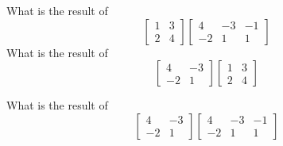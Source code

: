 \bexo
What is the result of 
\begin{equation*}
\left[
\begin{array}{cc}
1 & 3\\
2 & 4
\end{array}
\right]
\left[
\begin{array}{ccc}
4 & -3 & -1\\
-2 & 1 & 1
\end{array}
\right]
\end{equation*}
\eexo
{}
\bexo
What is the result of 
\begin{equation*}
\left[
\begin{array}{cc}
4 & -3\\
-2 & 1
\end{array}
\right]
\left[
\begin{array}{cc}
1 & 3\\
2 & 4
\end{array}
\right]
\end{equation*}

\eexo
\solution{
\begin{equation*}
\left[
\begin{array}{cc}
-2 & 0\\
0 & -2
\end{array}
\right]
\end{equation*}
}
\bexo
What is the result of 
\begin{equation*}
\left[
\begin{array}{cc}
4 & -3\\
-2 & 1
\end{array}
\right]
\left[
\begin{array}{ccc}
4 & -3 & -1\\
-2 & 1 & 1
\end{array}
\right]
\end{equation*}

\eexo
{}



